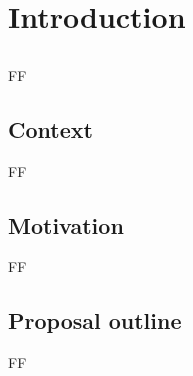 \chapter{Introduction}\label{chap:introduction}



\section*{}

FF



\section{Context}

FF



\section{Motivation}

FF


\section{Proposal outline}

FF
